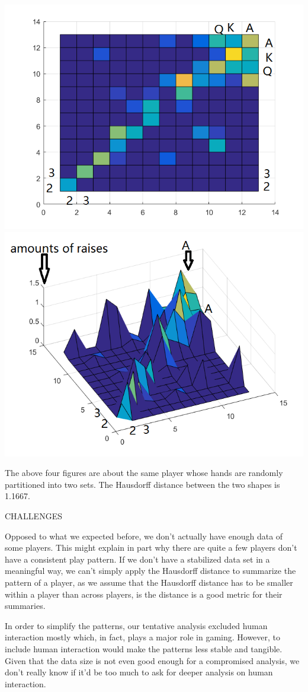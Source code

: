 \documentclass[12pt]{article}
\begin{document}
\includegraphics[scale=.5]{BEL5}
\includegraphics[scale=.5]{BEL51}

The above four figures are about the same player whose hands are randomly partitioned into two sets. The Hausdorff distance between the two shapes is 1.1667.


CHALLENGES 

Opposed to what we expected before, we don't actually have enough data of some players. This might explain in part why there are quite a few players don't have a consistent play pattern. If we don't have a stabilized data set in a meaningful way, we can't simply apply the Hausdorff distance to summarize the pattern of a player, as we assume that the Hausdorff distance has to be smaller within a player than across players, is the distance is a good metric for their summaries.

In order to simplify the patterns,
our tentative analysis excluded human interaction mostly which, in fact, plays a major role in gaming. However, to include human interaction would make the patterns less stable and tangible. Given that the data size is not even good enough for a compromised analysis, we don't really know if it'd be too much to ask for deeper analysis on human interaction.




 
        
  
 
\end{document}
